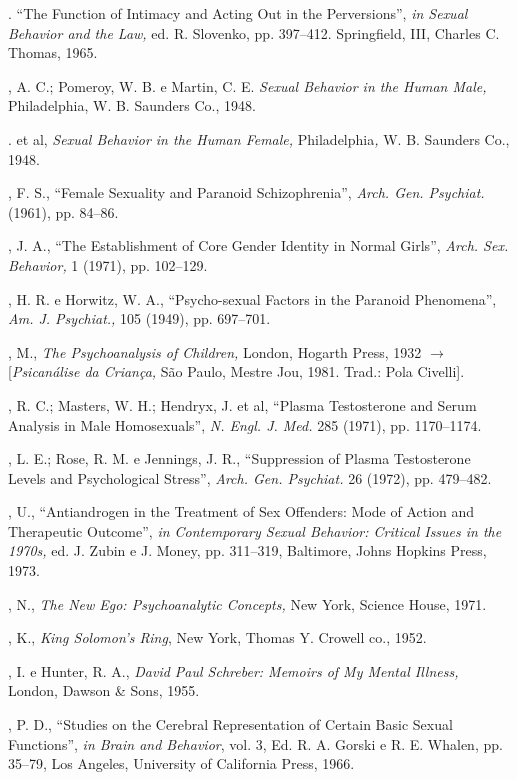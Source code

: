 \begin{description}
. ``The Function of Intimacy and Acting Out in the
Perversions'', \textit{in Sexual Behavior and the Law, }ed. R.
Slovenko, pp. 397--412. Springfield, III, Charles C. Thomas, 1965.

, A. C.; Pomeroy, W. B. e Martin, C. E. \textit{Sexual Behavior in the
Human Male, }Philadelphia, W. B. Saunders Co., 1948.

. et al, \textit{Sexual Behavior in the Human Female,
}Philadelphia\textit{, }W. B. Saunders Co., 1948.

, F. S., ``Female Sexuality and Paranoid
Schizophrenia'', \textit{Arch. Gen. Psychiat. } (1961), pp. 84--86.

, J. A., ``The Establishment of Core Gender Identity in
Normal Girls'', \textit{ Arch. Sex. Behavior, } 1 (1971), pp.
102--129.

, H. R. e Horwitz, W. A., ``Psycho-sexual Factors in the
Paranoid Phenomena'', \textit{Am. J. Psychiat., } 105 (1949), pp.
697--701.

, M., \textit{The Psychoanalysis of Children, }London, Hogarth Press, 1932
{$\bm{\rightarrow}$} [\textit{Psicanálise da Criança, }São Paulo, Mestre Jou, 1981. Trad.: Pola
Civelli].

, R. C.; Masters, W. H.; Hendryx, J. et al, ``Plasma
Testosterone and Serum Analysis in Male Homosexuals'', \textit{N.
Engl. J. Med. } 285 (1971), pp. 1170--1174.

, L. E.; Rose, R. M. e Jennings, J. R., ``Suppression of
Plasma Testosterone Levels and Psychological Stress'', \textit{Arch.
Gen. Psychiat. }26 (1972), pp. 479--482.

, U., ``Antiandrogen in the Treatment of Sex Offenders:
Mode of Action and Therapeutic Outcome'', \textit{in Contemporary
Sexual Behavior: Critical Issues in the 1970s, } ed. J. Zubin e J. Money, pp.
311--319, Baltimore, Johns Hopkins Press, 1973.

, N., \textit{The New Ego: Psychoanalytic Concepts, }New York, Science
House, 1971.

, K., \textit{King Solomon's Ring}, New York, Thomas Y.
Crowell co., 1952.

, I. e Hunter, R. A., \textit{David Paul Schreber: Memoirs of My
Mental Illness, }London, Dawson \& Sons, 1955.

, P. D., ``Studies on the Cerebral Representation of
Certain Basic Sexual Functions'', \textit{in Brain and Behavior},
vol. 3, Ed. R. A. Gorski e R. E. Whalen, pp. 35--79, Los Angeles, University of
California Press, 1966.


\end{description}
